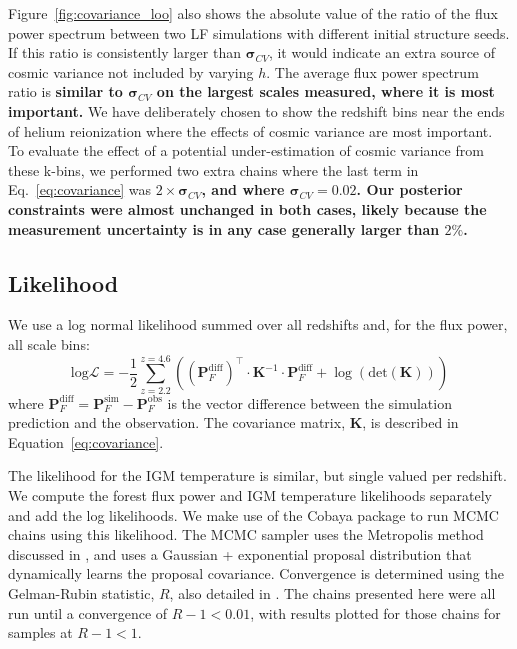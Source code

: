 Figure~\ref{fig:covariance_loo} also shows the absolute value of the ratio of the flux power spectrum between two LF simulations with different initial structure seeds. If this ratio is consistently larger than $\boldsymbol{\sigma}_{CV}$, it would indicate an extra source of cosmic variance not included by varying $h$. The average flux power spectrum ratio is \textbf{similar to $\boldsymbol{\sigma}_{CV}$ on the largest scales measured, where it is most important.} We have deliberately chosen to show the redshift bins near the ends of helium reionization where the effects of cosmic variance are most important. To evaluate the effect of a potential under-estimation of cosmic variance from these k-bins, we performed two extra chains where the last term in Eq.~\ref{eq:covariance} was $2\times \boldsymbol{\sigma}_{CV}$\textbf{, and where $\boldsymbol{\sigma}_{CV} = 0.02$. Our posterior constraints were almost unchanged in both cases, likely because the measurement uncertainty is in any case generally larger than $2\%$.}

\subsection{Likelihood}\label{sec:likelihood}

We use a log normal likelihood summed over all redshifts and, for the flux power, all scale bins:
\begin{equation}
    \mathrm{log}\mathcal{L} = -\frac{1}{2} \sum_{z=2.2}^{z=4.6} \left(\left(\boldsymbol{P}_F^{\mathrm{diff}}\right)^\top \cdot \boldsymbol{K}^{-1} \cdot \boldsymbol{P}_F^{\mathrm{diff}} + \log\left( \mathrm{det}(\boldsymbol{K})\right)\right)
    \label{eq:likelihood}
\end{equation}
where $\boldsymbol{P}_F^{\mathrm{diff}} = \boldsymbol{P}_F^{\mathrm{sim}} - \boldsymbol{P}_F^{\mathrm{obs}}$ is the vector difference between the simulation prediction and the observation.
The covariance matrix, $\boldsymbol{K}$, is described in Equation~\ref{eq:covariance}. 

The likelihood for the IGM temperature is similar, but single valued per redshift.
We compute the \lya forest flux power and IGM temperature likelihoods separately and add the log likelihoods. We make use of the Cobaya package \cite{2021JCAP...05..057T, 2019ascl.soft10019T, 2013PhRvD..87j3529L, 2002PhRvD..66j3511L} to run MCMC chains using this likelihood.
The MCMC sampler uses the Metropolis method discussed in \cite{2013PhRvD..87j3529L}, and uses a Gaussian + exponential proposal distribution that dynamically learns the proposal covariance.
Convergence is determined using the Gelman-Rubin statistic, $R$, also detailed in \cite{2013PhRvD..87j3529L}.
The chains presented here were all run until a convergence of $R-1 < 0.01$, with results plotted for those chains for samples at $R-1 < 1$.

